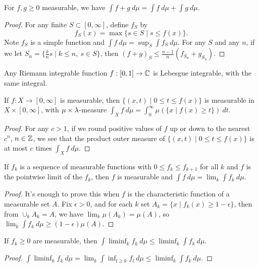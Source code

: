 \documentclass[letterpaper,11pt]{report}
\begin{document}
\begin{prop} For $f,g \ge 0$ measurable, we have $\int f+g\ d\mu = \int f\ d\mu + \int g\ d\mu$.
\end{prop}
\begin{proof} For any finite $S \subset [0,\infty]$, define $f_S$ by
\[
f_S(x) = \max \{s \in S \mid s \le f(x)\}.
\]
Note $f_S$ is a simple function and $\int f\ d\mu = \sup_S \int f_S\ d\mu$. For any $S$ and any $n$, if we let $S_n = \{\frac{k}{n}s\mid k \le n,\ s\in S\}$, then $(f+g)_S \le \frac{n-1}{n}(f_{S_n}+g_{S_n})$.
\end{proof}

\begin{prop} Any Riemann integrable function $f:[0,1] \rightarrow \mathbb{C}$ is Lebesgue integrable, with the same integral.
\end{prop}

\begin{prop} If $f:X \rightarrow [0,\infty]$ is measurable, then $\{(x,t) \mid 0 \le t \le f(x)\}$ is measurable in $X\times [0,\infty]$, with $\mu\times\lambda$-measure $\int_X f\ d\mu = \int_0^\infty \mu(\{x \mid f(x) \ge t\})\ dt$.
\end{prop}
\begin{proof} For any $c > 1$, if we round positive values of $f$ up or down to the nearest $c^n$, $n \in \mathbb{Z}$, we see that the product outer measure of $\{(x,t) \mid 0 \le t \le f(x)\}$ is at most $c$ times $\int_X f\ d\mu$.
\end{proof}

\begin{thm}\label{monotone-convergence} If $f_k$ is a sequence of measurable functions with $0 \le f_k \le f_{k+1}$ for all $k$ and $f$ is the pointwise limit of the $f_k$, then $f$ is measurable and $\int f\ d\mu = \lim_k \int f_k\ d\mu$.
\end{thm}
\begin{proof} It's enough to prove this when $f$ is the characteristic function of a measurable set $A$. Fix $\epsilon > 0$, and for each $k$ set $A_k = \{x \mid f_k(x) \ge 1-\epsilon\}$, then from $\cup_k A_k = A$, we have $\lim_k \mu(A_k) = \mu(A)$, so $\lim_k \int f_k\ d\mu \ge (1-\epsilon)\mu(A)$.
\end{proof}

\begin{lem} If $f_k \ge 0$ are measurable, then $\int \liminf_k f_k\ d\mu \le \liminf_k \int f_k\ d\mu$.
\end{lem}
\begin{proof} $\int \liminf_k f_k\ d\mu = \lim_k \int \inf_{l\ge k} f_l\ d\mu \le \liminf_k \int f_k\ d\mu$.
\end{proof}
\end{document}
